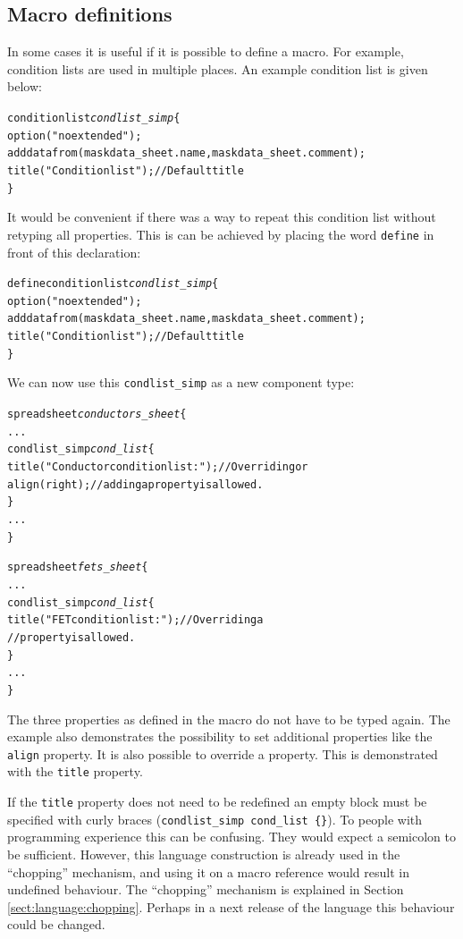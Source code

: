 \subsection{Macro definitions} \label{sect:language:macros}
In some cases it is useful if it is possible to define a macro. For example,
condition lists are used in multiple places. An example condition list is given
below:
\begin{alltt}
conditionlist \emph{condlist_simp} \{
    option("noextended");
    adddatafrom(maskdata_sheet.name, maskdata_sheet.comment);
    title("Condition list"); // Default title
\}
\end{alltt}
It would be convenient if there was a way to repeat this condition list without
retyping all properties. This is can be achieved by placing the word
\verb=define= in front of this declaration:
\begin{alltt}
define conditionlist \emph{condlist_simp} \{
    option("noextended");
    adddatafrom(maskdata_sheet.name, maskdata_sheet.comment);
    title("Condition list"); // Default title
\}
\end{alltt}
We can now use this \verb=condlist_simp= as a new component type:
\begin{alltt}
spreadsheet \emph{conductors_sheet} \{
    ...
    condlist_simp \emph{cond_list} \{
        title("Conductor condition list:"); // Overriding or
        align(right);  // adding a property is allowed.
    \}
    ...
\}

spreadsheet \emph{fets_sheet} \{
    ...
    condlist_simp \emph{cond_list} \{
        title("FET condition list:"); // Overriding a
                               // property is allowed.
    \}
    ...
\}
\end{alltt}
The three properties as defined in the macro do not have to be typed again. The
example also demonstrates the possibility to set additional properties like the
\verb=align= property. It is also possible to override a property. This is
demonstrated with the \verb=title= property.

If the \verb=title= property does not need to be redefined an empty block must
be specified with curly braces (\verb=condlist_simp cond_list {}=). To people
with programming experience this can be confusing. They would expect a
semicolon to be sufficient. However, this language construction is already used
in the ``chopping'' mechanism, and using it on a macro reference would result
in undefined behaviour. The ``chopping'' mechanism is explained in Section
\ref{sect:language:chopping}. Perhaps in a next release of the language this
behaviour could be changed.

